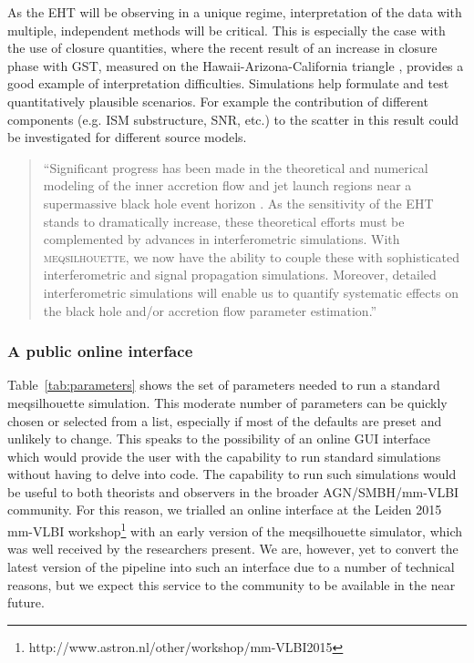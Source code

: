 As the EHT will be observing in a unique regime, interpretation of the data with multiple, independent methods will be critical. This is especially the case with the use of closure quantities, where the recent result of an increase in closure phase with GST, measured on the Hawaii-Arizona-California triangle \citep{Fish_2016}, provides a good example of interpretation difficulties. Simulations help formulate and test quantitatively plausible scenarios. For example the contribution of different components (e.g. ISM substructure, SNR, etc.) to the scatter in this result could be investigated for different source models. 

\begin{quotation}
``Significant progress has been made in the theoretical and numerical modeling of the inner accretion flow and jet launch regions near a supermassive black hole event horizon
\citep[e.g.][]{Zanna_2007,Etienne_2010,Dexter_2013,Moscibrodzka_2014, McKinney_2014}. As the sensitivity of the EHT stands to dramatically increase, these theoretical efforts must be complemented by advances in interferometric simulations. With \textsc{meqsilhouette}, we now have the ability to couple these with sophisticated interferometric and signal propagation simulations.  Moreover, detailed interferometric simulations will enable us to quantify systematic effects on the black hole and/or accretion flow parameter estimation.''\\
\citep{Blecher_2016}
\end{quotation}



\subsubsection{A public online interface}
Table~\ref{tab:parameters} shows the set of parameters needed to run a standard {\sc meqsilhouette} simulation. This moderate number of parameters can be quickly chosen or selected from a list, especially if most of the defaults are preset and unlikely to change. This speaks to the possibility of an online GUI interface which would provide the user with the capability to run standard simulations without having to delve into code. The capability to run such simulations would be useful to both theorists and observers in the broader AGN/SMBH/mm-VLBI community. For this reason, we trialled an online interface at the Leiden 2015 mm-VLBI workshop\footnote{http://www.astron.nl/other/workshop/mm-VLBI2015} with an early version of the {\sc meqsilhouette} simulator, which was well received by the researchers present. We are, however, yet to convert the latest version of the pipeline \citep{Blecher_2016} into such an interface due to a number of technical reasons, but we expect this service to the community to be available in the near future.


